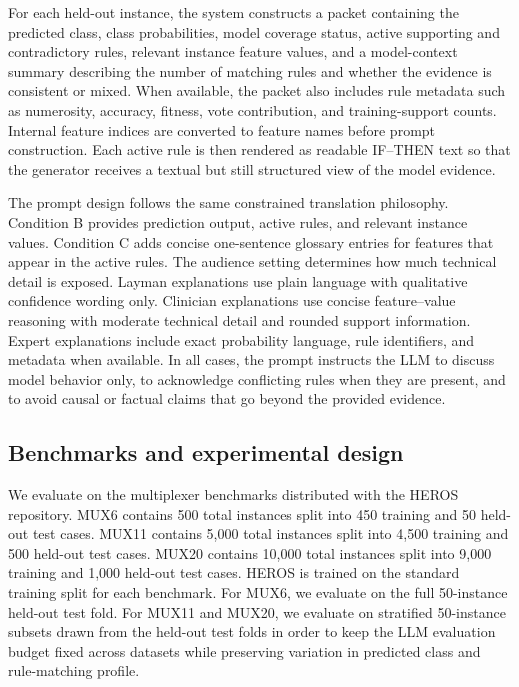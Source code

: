 \documentclass[sigconf,nonacm]{acmart}
\begin{document}
For each held-out instance, the system constructs a packet containing the predicted class, class probabilities, model coverage status, active supporting and contradictory rules, relevant instance feature values, and a model-context summary describing the number of matching rules and whether the evidence is consistent or mixed. When available, the packet also includes rule metadata such as numerosity, accuracy, fitness, vote contribution, and training-support counts. Internal feature indices are converted to feature names before prompt construction. Each active rule is then rendered as readable IF--THEN text so that the generator receives a textual but still structured view of the model evidence.

The prompt design follows the same constrained translation philosophy. Condition B provides prediction output, active rules, and relevant instance values. Condition C adds concise one-sentence glossary entries for features that appear in the active rules. The audience setting determines how much technical detail is exposed. Layman explanations use plain language with qualitative confidence wording only. Clinician explanations use concise feature--value reasoning with moderate technical detail and rounded support information. Expert explanations include exact probability language, rule identifiers, and metadata when available. In all cases, the prompt instructs the LLM to discuss model behavior only, to acknowledge conflicting rules when they are present, and to avoid causal or factual claims that go beyond the provided evidence.

\subsection{Benchmarks and experimental design}
We evaluate on the multiplexer benchmarks distributed with the HEROS repository. MUX6 contains 500 total instances split into 450 training and 50 held-out test cases. MUX11 contains 5{,}000 total instances split into 4{,}500 training and 500 held-out test cases. MUX20 contains 10{,}000 total instances split into 9{,}000 training and 1{,}000 held-out test cases. HEROS is trained on the standard training split for each benchmark. For MUX6, we evaluate on the full 50-instance held-out test fold. For MUX11 and MUX20, we evaluate on stratified 50-instance subsets drawn from the held-out test folds in order to keep the LLM evaluation budget fixed across datasets while preserving variation in predicted class and rule-matching profile.
\end{document}
